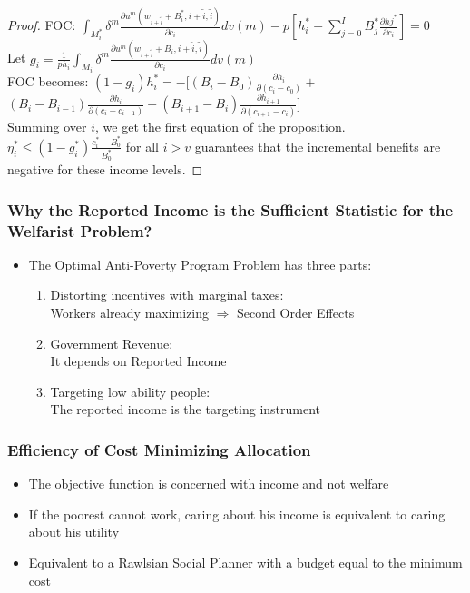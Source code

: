 \documentclass[xcolor=pdftex,dvipsnames,table]{beamer}
\begin{document}
\begin{frame}[label=proof_welfare]
\begin{proof}
FOC: $\int_{M^*_i}\delta^m \frac{\partial u^m(w_{i+\tilde{i}}+B^*_i,i+\tilde{i},\tilde{i})}{\partial c_i}dv(m)-p\left[h_i^*+\sum_{j=0}^IB_j^*\frac{\partial hj^*}{\partial c_i}\right]=0$ \\
Let $g_i=\frac{1}{p h_i}\int_{M_i} \delta^m \frac{\partial u^m(w_{i+\tilde{i}}+B_i,i+\tilde{i},\tilde{i})}{\partial c_i} dv(m)$\\
FOC becomes: $(1-g_i)h_i^*=-\Big[(B_i-B_0)\frac{\partial h_i}{\partial (c_i-c_0)}+$\\
$(B_i-B_{i-1})\frac{\partial h_i}{\partial(c_i-c_{i-1})}-(B_{i+1}-B_{i})\frac{\partial h_{i+1}}{\partial(c_{i+1}-c_{i})}\Big]$\\
Summing over $i$, we get the first equation of the proposition.\\
$\eta^{*}_i\leq (1-g^*_i)\frac{c^*_i-B_0^*}{B_0^*}$ for all $i>v$ guarantees that the incremental benefits are negative for these income levels.
\end{proof}
\end{frame}

\begin{frame}[label=sufficient_wel]
\frametitle{Why the Reported Income is the Sufficient Statistic  for the Welfarist Problem?}
\begin{itemize}
\item The Optimal Anti-Poverty Program Problem has three parts: 

\begin{enumerate}
\item Distorting incentives with marginal taxes: \\
Workers already maximizing 
$\Rightarrow$ Second Order Effects

\item Government Revenue: \\
It depends on Reported Income
\item Targeting low ability people: \\
The reported income is the targeting instrument
\end{enumerate}
\end{itemize}
\hyperlink{prop_imp}{}
\end{frame}

\begin{frame}[label=efficiency]
	\frametitle{Efficiency of Cost Minimizing Allocation}
\begin{itemize}
\item The objective function is concerned with income and not welfare  
\item If the poorest cannot work, caring about his income is equivalent to caring about his utility
\item Equivalent to a Rawlsian Social Planner with a budget equal to the minimum cost
\end{itemize}
\end{frame}
\end{document}
